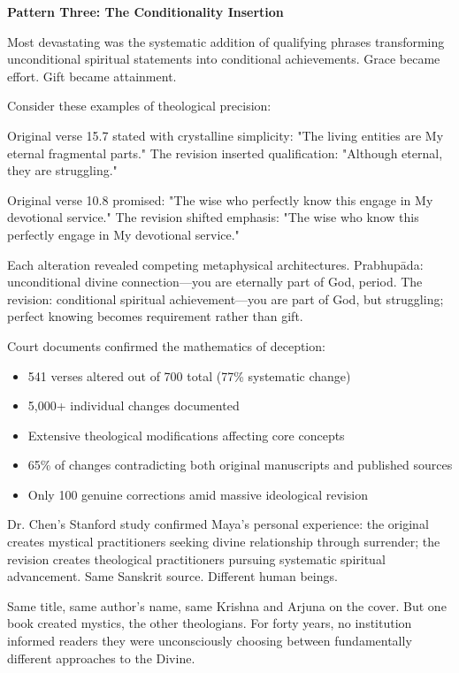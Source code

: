 \documentclass[11pt,twoside]{book}
\begin{document}
\textbf{\textbf{Pattern Three: The Conditionality Insertion}}

Most devastating was the systematic addition of qualifying phrases transforming unconditional spiritual statements into conditional achievements. Grace became effort. Gift became attainment.

Consider these examples of theological precision:

Original verse 15.7 stated with crystalline simplicity: "The living entities are My eternal fragmental parts."
The revision inserted qualification: "Although eternal, they are struggling."

Original verse 10.8 promised: "The wise who perfectly know this engage in My devotional service."  
The revision shifted emphasis: "The wise who know this perfectly engage in My devotional service."

Each alteration revealed competing metaphysical architectures. Prabhupāda: unconditional divine connection—you are eternally part of God, period. The revision: conditional spiritual achievement—you are part of God, but struggling; perfect knowing becomes requirement rather than gift.

Court documents confirmed the mathematics of deception:

\begin{itemize}
\item 541 verses altered out of 700 total (77\% systematic change)
\item 5,000+ individual changes documented
\item Extensive theological modifications affecting core concepts
\item 65\% of changes contradicting both original manuscripts and published sources
\item Only 100 genuine corrections amid massive ideological revision
\end{itemize}

Dr. Chen's Stanford study confirmed Maya's personal experience: the original creates mystical practitioners seeking divine relationship through surrender; the revision creates theological practitioners pursuing systematic spiritual advancement. Same Sanskrit source. Different human beings.

Same title, same author's name, same Krishna and Arjuna on the cover. But one book created mystics, the other theologians. For forty years, no institution informed readers they were unconsciously choosing between fundamentally different approaches to the Divine.
\end{document}
